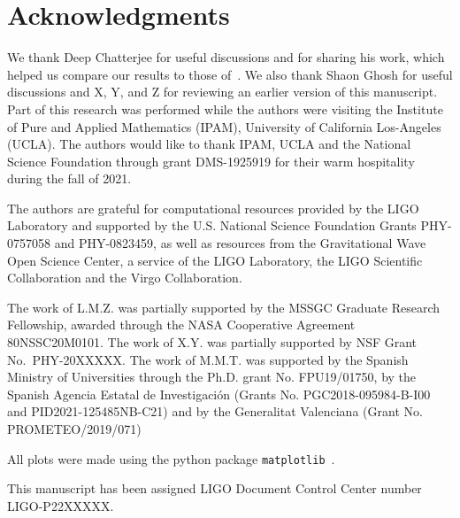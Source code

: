 \section*{Acknowledgments}
We thank Deep Chatterjee for useful discussions and for sharing his work, which
helped us compare our results to those of~\cite{Chatterjee:2019avs}. We also
thank Shaon Ghosh for useful discussions and X, Y, and Z for reviewing an
earlier version of this manuscript. Part of this research was performed while
the authors were visiting the Institute of Pure and Applied Mathematics (IPAM), 
University of California Los-Angeles (UCLA). The authors would like to thank 
IPAM, UCLA and the National Science Foundation through grant DMS-1925919 for
their warm hospitality during the fall of 2021. 
%

The authors are grateful for computational resources provided by the LIGO 
Laboratory and supported by the U.S. National Science Foundation Grants 
PHY-0757058 and PHY-0823459, as well as resources from the Gravitational Wave
Open Science Center, a service of the LIGO Laboratory, the LIGO Scientific 
Collaboration and the Virgo Collaboration.
%

The work of L.M.Z. was partially supported by the MSSGC Graduate
Research Fellowship, awarded through the NASA Cooperative Agreement
80NSSC20M0101. 
%
The work of X.Y. was partially supported by NSF Grant No.~PHY-20XXXXX.
%
The work of M.M.T. was supported by the Spanish Ministry of Universities through the Ph.D. grant No. FPU19/01750, by the Spanish Agencia Estatal de Investigaci\'on (Grants No. PGC2018-095984-B-I00 and PID2021-125485NB-C21) and by the Generalitat Valenciana (Grant No. PROMETEO/2019/071)

All plots were made using the python package \texttt{matplotlib}~\cite{Hunter:2007ouj}.

This manuscript has been assigned LIGO Document Control Center number LIGO-P22XXXXX.
